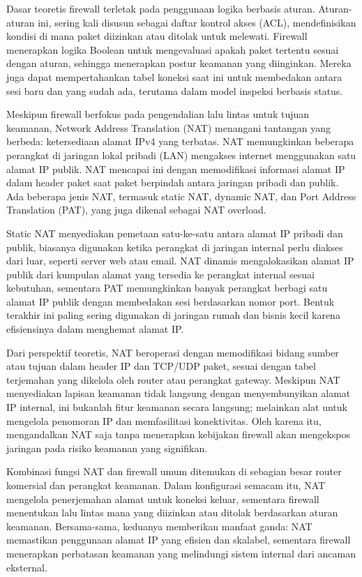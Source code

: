 Dasar teoretis firewall terletak pada penggunaan logika berbasis 
aturan. Aturan-aturan ini, sering kali disusun sebagai daftar 
kontrol akses (ACL), mendefinisikan kondisi di mana paket 
diizinkan atau ditolak untuk melewati. Firewall menerapkan 
logika Boolean untuk mengevaluasi apakah paket tertentu sesuai 
dengan aturan, sehingga menerapkan postur keamanan yang 
diinginkan. Mereka juga dapat mempertahankan tabel koneksi saat 
ini untuk membedakan antara sesi baru dan yang sudah ada, 
terutama dalam model inspeksi berbasis status.

Meskipun firewall berfokus pada pengendalian lalu lintas untuk tujuan 
keamanan, Network Address Translation (NAT) menangani tantangan 
yang berbeda: ketersediaan alamat IPv4 yang terbatas. NAT 
memungkinkan beberapa perangkat di jaringan lokal pribadi (LAN) 
mengakses internet menggunakan satu alamat IP publik. NAT 
mencapai ini dengan memodifikasi informasi alamat IP dalam 
header paket saat paket berpindah antara jaringan pribadi dan 
publik. Ada beberapa jenis NAT, termasuk static NAT, dynamic NAT, 
dan Port Address Translation (PAT), yang juga dikenal sebagai 
NAT overload.

Static NAT menyediakan pemetaan satu-ke-satu antara alamat IP 
pribadi dan publik, biasanya digunakan ketika perangkat di 
jaringan internal perlu diakses dari luar, seperti server web 
atau email. NAT dinamis mengalokasikan alamat IP publik dari 
kumpulan alamat yang tersedia ke perangkat internal sesuai 
kebutuhan, sementara PAT memungkinkan banyak perangkat berbagi 
satu alamat IP publik dengan membedakan sesi berdasarkan nomor 
port. Bentuk terakhir ini paling sering digunakan di jaringan 
rumah dan bisnis kecil karena efisiensinya dalam menghemat 
alamat IP.

Dari perspektif teoretis, NAT beroperasi dengan memodifikasi 
bidang sumber atau tujuan dalam header IP dan TCP/UDP paket, 
sesuai dengan tabel terjemahan yang dikelola oleh router atau 
perangkat gateway. Meskipun NAT menyediakan lapisan keamanan tidak 
langsung dengan menyembunyikan alamat IP internal, ini bukanlah 
fitur keamanan secara langsung; melainkan alat untuk mengelola 
penomoran IP dan memfasilitasi konektivitas. Oleh karena itu, 
mengandalkan NAT saja tanpa menerapkan kebijakan firewall akan 
mengekspos jaringan pada risiko keamanan yang signifikan.

Kombinasi fungsi NAT dan firewall umum ditemukan di sebagian 
besar router komersial dan perangkat keamanan. Dalam konfigurasi 
semacam itu, NAT mengelola penerjemahan alamat untuk koneksi 
keluar, sementara firewall menentukan lalu lintas mana yang 
diizinkan atau ditolak berdasarkan aturan keamanan. Bersama-sama, 
keduanya memberikan manfaat ganda: NAT memastikan penggunaan 
alamat IP yang efisien dan skalabel, sementara firewall 
menerapkan perbatasan keamanan yang melindungi sistem internal 
dari ancaman eksternal.

